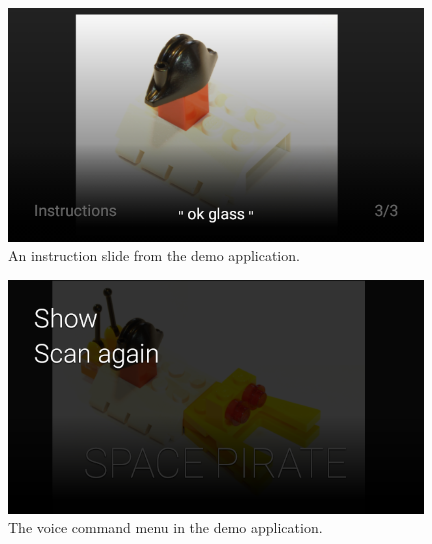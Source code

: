 	\begin{figure}[H]%
		\centering
		\includegraphics[width=110mm]{images/demo/instructionImage}
		\caption{An instruction slide from the demo application.}
		\label{glassDemoInstructionImage}
	\end{figure}
	
	\begin{figure}[H]%
		\centering
		\includegraphics[width=110mm]{images/demo/voiceCommand1}
		\caption{The voice command menu in the demo application.}
		\label{glassDemoVoiceCommand}
	\end{figure}


